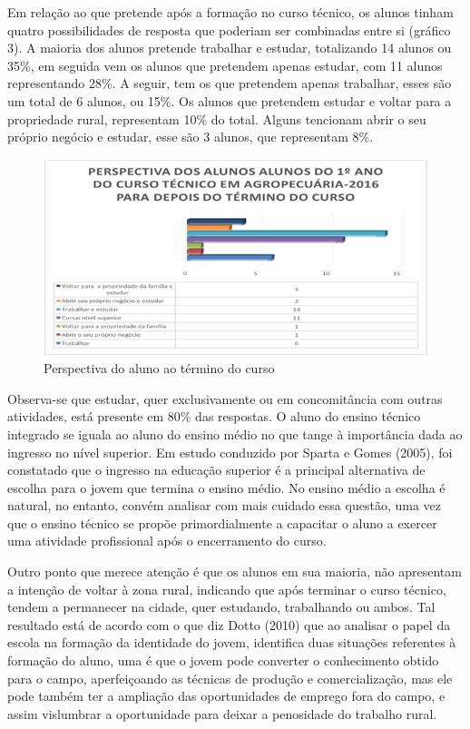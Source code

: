 \documentclass[article,12pt,onesidea,4paper,english,brazil]{abntex2}
\begin{document}
	Em relação ao que pretende após a formação no curso técnico, os alunos tinham quatro possibilidades de resposta que poderiam ser combinadas entre si (gráfico 3). A maioria dos alunos pretende trabalhar e estudar, totalizando 14 alunos ou 35\%, em seguida vem os alunos que pretendem apenas estudar, com 11 alunos representando 28\%. A seguir, tem os que pretendem apenas trabalhar, esses são um total de 6 alunos, ou 15\%. Os alunos que pretendem estudar e voltar para a propriedade rural, representam 10\% do total. Alguns tencionam abrir o seu próprio negócio e estudar, esse são 3 alunos, que representam 8\%.
	\begin{figure}[h]
		\centering
		\includegraphics[width=\linewidth]{pip-artigo14-01}
		\caption{Perspectiva do aluno ao término do curso}
		\label{fig:pip-artigo14-01}
	\end{figure}
Observa-se que estudar, quer exclusivamente ou em concomitância com outras atividades, está presente em 80\% das respostas. O aluno do ensino técnico integrado se iguala ao aluno do ensino médio no que tange à importância dada ao ingresso no nível superior. Em estudo conduzido por Sparta e Gomes (2005), foi constatado que o ingresso na educação superior é a principal alternativa de escolha para o jovem que termina o ensino médio. No ensino médio a escolha é natural, no entanto, convém analisar com mais cuidado essa questão, uma vez que o ensino técnico se propõe primordialmente a capacitar o aluno a exercer uma atividade profissional após o encerramento do curso.

Outro ponto que merece atenção é que os alunos em sua maioria, não apresentam a intenção de voltar à zona rural, indicando que após terminar o curso técnico, tendem a permanecer na cidade, quer estudando, trabalhando ou ambos. Tal resultado está de acordo com o que diz Dotto (2010) que ao analisar o papel da escola na formação da identidade do jovem, identifica duas situações referentes à formação do aluno, uma é que o jovem pode converter o conhecimento obtido para o campo, aperfeiçoando as técnicas de produção e comercialização, mas ele pode também ter a ampliação das oportunidades de emprego fora do campo, e assim vislumbrar a oportunidade para deixar a penosidade do trabalho rural.
\end{document}
